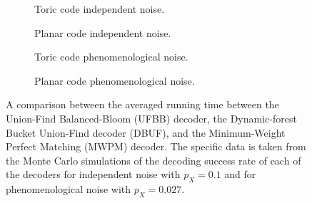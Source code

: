 \begin{figure}[htbp]
  \centering
  \begin{subfigure}[b]{0.49\textwidth}
    \begin{adjustbox}{Clip=0 1em 0 0}
      
    \end{adjustbox}
    \caption{Toric code independent noise.}
  \end{subfigure}
  \begin{subfigure}[b]{0.49\textwidth}
    \begin{adjustbox}{Clip=0 1em 0 0}
      
    \end{adjustbox}
    \caption{Planar code independent noise.}
  \end{subfigure}
  \begin{subfigure}[b]{0.49\textwidth}
    \begin{adjustbox}{Clip=0 1em 0 0}
      
    \end{adjustbox}
    \caption{Toric code phenomenological noise.}
  \end{subfigure}
  \begin{subfigure}[b]{0.49\textwidth}
    \begin{adjustbox}{Clip=0 1em 0 0}
      
    \end{adjustbox}
    \caption{Planar code phenomenological noise.}
  \end{subfigure}
  \caption{A comparison between the averaged running time between the Union-Find Balanced-Bloom (UFBB) decoder, the Dynamic-forest Bucket Union-Find decoder (DBUF), and the Minimum-Weight Perfect Matching (MWPM) decoder. The specific data is taken from the Monte Carlo simulations of the decoding success rate of each of the decoders for independent noise with $p_X = 0.1$ and for phenomenological noise with $p_X = 0.027$.}
  \label{fig:tcomp_ufbb}
\end{figure}